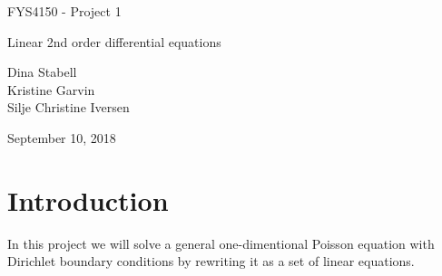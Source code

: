 \documentclass[norsk]{article}
\begin{document}
	\vspace*{1cm}
	\begin{center}
	{\huge FYS4150 - Project 1 \par}
	{\huge Linear 2nd order differential equations\par}
	\vspace{0.5cm}
	{\Large Dina Stabell \\ Kristine Garvin \\ Silje Christine Iversen \par}	
	\vspace{0.5cm}
	{\Large September 10, 2018 \par}
	\vspace{1cm}
	\end{center}
	
\section{Introduction}
In this project we will solve a general one-dimentional Poisson equation with Dirichlet boundary conditions by rewriting it as a set of linear equations. 
\end{document}

